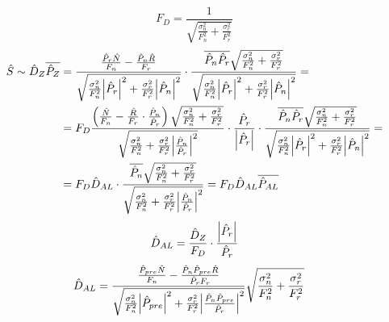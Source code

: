 \documentclass[11pt]{article}
\begin{document}
\begin{equation}
F_D = \frac{1}{\sqrt{\frac{\sigma_n^2}{F_n^2} + \frac{\sigma_r^2}{F_r^2}}}
\end{equation}
%
\begin{align}
  \hat{S} \sim \hat{D}_Z\overline{\hat{P}_Z} &= \frac
  {\frac{\hat{P}_r\hat{N}}{F_n} - \frac{\hat{P}_n\hat{R}}{F_r}}
  {\sqrt{\frac{\sigma_n^2}{F_n^2}\abs{\hat{P}_r}^2 +
      \frac{\sigma_r^2}{F_r^2}\abs{\hat{P}_n}^2}}
  \cdot
  \frac{\overline{\hat{P}_n\hat{P}_r}\sqrt{\frac{\sigma_n^2}{F_n^2} + \frac{\sigma_r^2}{F_r^2}}}
  {\sqrt{\frac{\sigma_n^2}{F_n^2}\abs{\hat{P}_r}^2 +
      \frac{\sigma_r^2}{F_r^2}\abs{\hat{P}_n}^2}} = \label{eq:DzPz}\\
 &= F_D \frac
  {\left(\frac{\hat{N}}{F_n} -  \frac{\hat{R}}{F_r} \cdot
    \frac{\hat{P}_n}{\hat{P}_r}\right) \sqrt{\frac{\sigma_n^2}{F_n^2} + \frac{\sigma_r^2}{F_r^2}} }
  {\sqrt{\frac{\sigma_n^2}{F_n^2} +
      \frac{\sigma_r^2}{F_r^2}\abs{\frac{\hat{P}_n}{\hat{P}_r}}^2}}
  \cdot
  \frac{\hat{P}_r}{\abs{\hat{P}_r}}
  \cdot
  \frac{\overline{\hat{P}_n\hat{P}_r}\sqrt{\frac{\sigma_n^2}{F_n^2} + \frac{\sigma_r^2}{F_r^2}}}
  {\sqrt{\frac{\sigma_n^2}{F_n^2}\abs{\hat{P}_r}^2 +
      \frac{\sigma_r^2}{F_r^2}\abs{\hat{P}_n}^2}} = \\
  &= F_D \hat{D}_{AL} \cdot \frac{\overline{\hat{P}_n}
  \sqrt{\frac{\sigma_n^2}{F_n^2} + \frac{\sigma_r^2}{F_r^2}}}
  {\sqrt{\frac{\sigma_n^2}{F_n^2} +
      \frac{\sigma_r^2}{F_r^2}\abs{\frac{\hat{P}_n}{\hat{P}_r}}^2}} =
F_D \hat{D}_{AL}\overline{\hat{P}_{AL}}
\label{eq:DalDzPrPr}
\end{align}
%
\begin{equation}
\hat{D}_{AL} = \frac{\hat{D}_Z}{F_D}\cdot\frac{\abs{\hat{P}_r}}{\hat{P}_r}
\end{equation}
%
\begin{align}
  \hat{D}_{AL} &= \frac
  {\frac{\hat{P}_{pre}\hat{N}}{F_n} -
    \frac{\hat{P}_n\hat{P}_{pre}\hat{R}}{\hat{P}_r F_r} }
  {\sqrt{\frac{\sigma_n^2}{F_n^2}\abs{\hat{P}_{pre}}^2 +
      \frac{\sigma_r^2}{F_r^2}\abs{\frac{\hat{P}_n\hat{P}_{pre}}{\hat{P}_r}}^2}}
  \sqrt{\frac{\sigma_n^2}{F_n^2} + \frac{\sigma_r^2}{F_r^2}}
                 \label{eq:DalPre}
\end{align}
%
\end{document}

